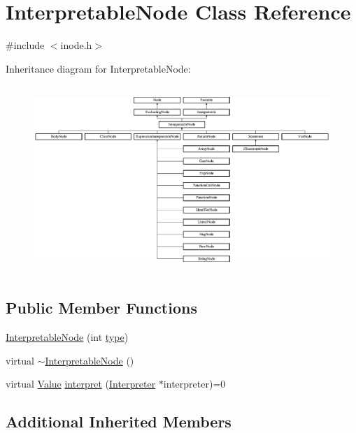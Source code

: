 \hypertarget{classInterpretableNode}{}\section{Interpretable\+Node Class Reference}
\label{classInterpretableNode}


{\ttfamily \#include $<$inode.\+h$>$}

Inheritance diagram for Interpretable\+Node\+:\begin{figure}[H]
\begin{center}
\leavevmode
\includegraphics[height=7.140255cm]{classInterpretableNode}
\end{center}
\end{figure}
\subsection*{Public Member Functions}
\begin{DoxyCompactItemize}
\item 
\hyperlink{classInterpretableNode_aeaf40b6165fe9810943c24f7037e03c1}{Interpretable\+Node} (int \hyperlink{classNode_af4f536b1b3f60e197fe364ba56022291}{type})
\item 
virtual \hyperlink{classInterpretableNode_a36f9960c9cfe7267fc518bd5e5462e2e}{$\sim$\+Interpretable\+Node} ()
\item 
virtual \hyperlink{classValue}{Value} \hyperlink{classInterpretableNode_a9a466e7d65c4b323d2b96b4ac8396cd7}{interpret} (\hyperlink{classInterpreter}{Interpreter} $\ast$interpreter)=0
\end{DoxyCompactItemize}
\subsection*{Additional Inherited Members}


